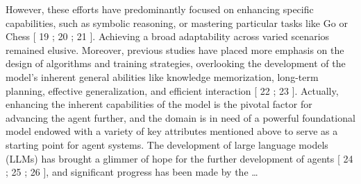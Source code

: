 \documentclass[11pt,a4paper,oneside]{memoir}
\begin{document}
\begin{tcolorbox}[origstyle]
\small However, these efforts have predominantly focused on enhancing specific capabilities, such as symbolic reasoning, or mastering particular tasks like Go or Chess [ 19 ; 20 ; 21 ]. Achieving a broad adaptability across varied scenarios remained elusive. Moreover, previous studies have placed more emphasis on the design of algorithms and training strategies, overlooking the development of the model’s inherent general abilities like knowledge memorization, long-term planning, effective generalization, and efficient interaction [ 22 ; 23 ]. Actually, enhancing the inherent capabilities of the model is the pivotal factor for advancing the agent further, and the domain is in need of a powerful foundational model endowed with a variety of key attributes mentioned above to serve as a starting point for agent systems. The development of large language models (LLMs) has brought a glimmer of hope for the further development of agents [ 24 ; 25 ; 26 ], and significant progress has been made by the \ldots
\end{tcolorbox}
\vspace{0.3em}
\end{document}
